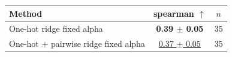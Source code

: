 \begin{tabular}{lcc}
\toprule
Method & spearman $\uparrow$ & $n$ \\
\midrule
One-hot ridge fixed alpha & \textbf{0.39 $\pm$ 0.05} & 35 \\
One-hot + pairwise ridge fixed alpha & \underline{0.37 $\pm$ 0.05} & 35 \\
\bottomrule
\end{tabular}
